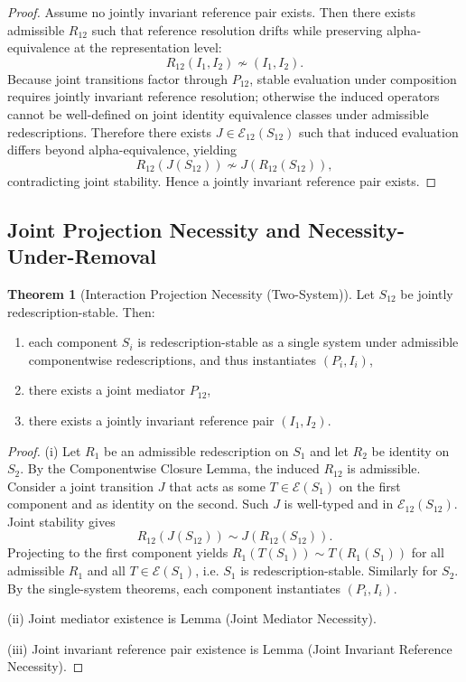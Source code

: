 \documentclass[11pt]{article}
\theoremstyle{definition}
\newtheorem{theorem}{Theorem}
\begin{document}
\begin{proof}
Assume no jointly invariant reference pair exists. Then there exists admissible $R_{12}$ such that reference resolution drifts while preserving
alpha-equivalence at the representation level:
\[
R_{12}(I_1,I_2)\not\sim (I_1,I_2).
\]
Because joint transitions factor through $P_{12}$, stable evaluation under composition requires jointly invariant reference resolution; otherwise the induced
operators cannot be well-defined on joint identity equivalence classes under admissible redescriptions. Therefore there exists
$J\in\mathcal{E}_{12}(S_{12})$ such that induced evaluation differs beyond alpha-equivalence, yielding
\[
R_{12}(J(S_{12}))\not\sim J(R_{12}(S_{12})),
\]
contradicting joint stability. Hence a jointly invariant reference pair exists.
\end{proof}

\subsection{Joint Projection Necessity and Necessity-Under-Removal}

\begin{theorem}[Interaction Projection Necessity (Two-System)]
Let $S_{12}$ be jointly redescription-stable. Then:
\begin{enumerate}[label=(\roman*)]
    \item each component $S_i$ is redescription-stable as a single system under admissible componentwise redescriptions, and thus instantiates $(P_i,I_i)$,
    \item there exists a joint mediator $P_{12}$,
    \item there exists a jointly invariant reference pair $(I_1,I_2)$.
\end{enumerate}
\end{theorem}

\begin{proof}
(i) Let $R_1$ be an admissible redescription on $S_1$ and let $R_2$ be identity on $S_2$. By the Componentwise Closure Lemma, the induced $R_{12}$ is admissible.
Consider a joint transition $J$ that acts as some $T\in\mathcal{E}(S_1)$ on the first component and as identity on the second. Such $J$ is well-typed and in
$\mathcal{E}_{12}(S_{12})$. Joint stability gives
\[
R_{12}(J(S_{12}))\sim J(R_{12}(S_{12})).
\]
Projecting to the first component yields $R_1(T(S_1))\sim T(R_1(S_1))$ for all admissible $R_1$ and all $T\in\mathcal{E}(S_1)$, i.e. $S_1$ is redescription-stable.
Similarly for $S_2$. By the single-system theorems, each component instantiates $(P_i,I_i)$.

(ii) Joint mediator existence is Lemma (Joint Mediator Necessity).

(iii) Joint invariant reference pair existence is Lemma (Joint Invariant Reference Necessity).
\end{proof}
\end{document}
